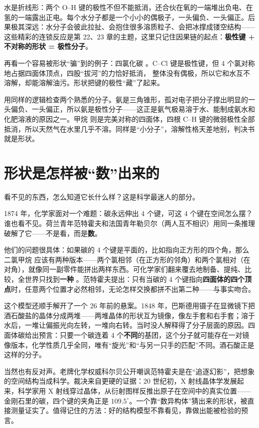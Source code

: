 水是折线形：两个 O–H 键的极性不但不能抵消，还合伙在氧的一端堆出负电、在氢的一端露出正电。每个水分子都是一个小小的偶极子，一头偏负、一头偏正。后果极其深远：水分子会彼此拉扯、会抱住很多溶质粒子、会把冰撑成镂空结构——这些精彩的连锁反应是第 22、23 章的主题，这里只记住因果链的起点：\textbf{极性键 + 不对称的形状 = 极性分子}。

再看一个容易被形状“骗”到的例子：四氯化碳 。C–Cl 键是极性键，但 4 个氯对称地占据四面体顶点，四股“拔河”的力恰好抵消， 整体没有偶极，所以它和水互不溶解，却能溶解油污。形状把键的极性“藏”了起来。

用同样的逻辑检查两个熟悉的分子。氨是三角锥形，孤对电子把分子撑出明显的一头偏负、一头偏正，所以氨是极性分子——这正是氨气极易溶于水、能制成氨水和化肥溶液的原因之一。甲烷  则是完美对称的四面体，四根 C–H 键的微弱极性全部抵消，所以天然气在水里几乎不溶。同样是“小分子”，溶解性格天差地别，判决书就是形状。

\section{形状是怎样被“数”出来的}

看不见的东西，怎么知道它长什么样？这是科学最迷人的部分。

\begin{zhengju}
1874 年，化学家面对一个难题：碳永远伸出 4 个键，可这 4 个键在空间怎么摆？谁也看不见。荷兰青年范特霍夫和法国青年勒贝尔（两人互不相识）用同一条推理破解了它——不是看，而是\textbf{数}。

他们的问题很具体：如果碳的 4 个键是平面的，比如指向正方形的四个角，那么二氯甲烷  应该有两种版本——两个氯相邻（在正方形的邻角）和两个氯相对（在对角），就像同一副零件能拼出两样东西。可化学家们翻来覆去地制备、提纯、比较，全世界只找到\textbf{一种} 。范特霍夫提出：只有当碳的 4 个键指向\textbf{四面体的四个顶点}时，任意两个位置才必然相邻，无论怎样交换都拼不出第二种——与事实吻合。

这个模型还顺手解开了一个 26 年前的悬案。1848 年，巴斯德用镊子在显微镜下把酒石酸盐的晶体分成两堆——两堆晶体的形状互为镜像，像左手套和右手套；溶于水后，一堆让偏振光向左转，一堆向右转。当时没人解释得了分子层面的原因。四面体碳给出预言：只要一个碳连着 4 个\textbf{不同}的基团，这个分子就可能存在一对镜像版本，化学性质几乎全同，唯有“旋光”和“与另一只手的匹配”不同。酒石酸正是这样的分子。

当然也有反对声。老牌化学权威科尔贝公开嘲讽范特霍夫是在“追逐幻影”，把想象的空间结构当成科学。裁决来自更硬的证据：20 世纪初，X 射线晶体学发展起来，科学家用 X 射线穿过晶体，从衍射图样反推出原子在空间中的真实位置——金刚石里的碳，四个键的夹角正是 $109.5^{\circ}$。一个靠“数异构体”猜出来的形状，被直接测量证实了。值得记住的方法：好的结构模型不靠看见，靠做出能被检验的预言。
\end{zhengju}

